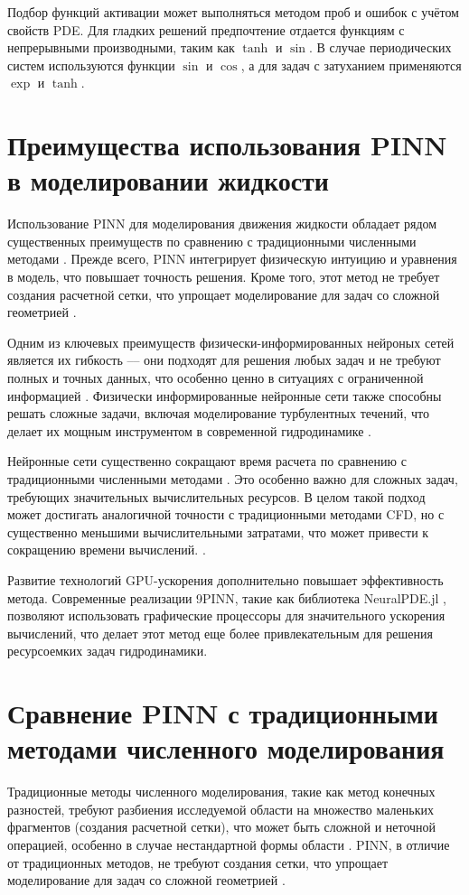 Подбор функций активации может выполняться методом проб и ошибок с учётом свойств PDE. Для гладких решений
предпочтение отдается функциям с непрерывными производными, таким как $\tanh$ и $\sin$. В случае периодических
систем используются функции $\sin$ и $\cos$, а для задач с затуханием применяются $\exp$ и $\tanh$.


\section{Преимущества использования PINN в моделировании жидкости}
Использование PINN для моделирования движения жидкости обладает рядом существенных преимуществ по сравнению
с традиционными численными методами \cite{cuomo2022scientific}. Прежде всего, PINN интегрирует физическую
интуицию и уравнения в модель, что повышает точность решения. Кроме того, этот метод не требует создания
расчетной сетки, что упрощает моделирование для задач со сложной геометрией \cite{cai2021physics}.

Одним из ключевых преимуществ физически-информированных нейроных сетей является их гибкость –-- они подходят для решения любых задач и
не требуют полных и точных данных, что особенно ценно в ситуациях с ограниченной
информацией \cite{karniadakis2021physics}. Физически информированные нейронные сети также способны решать
сложные задачи, включая моделирование турбулентных течений, что делает их мощным инструментом в современной
гидродинамике \cite{mao2020physics}.

Нейронные сети существенно сокращают время расчета по сравнению с традиционными численными
методами \cite{jagtap2020conservative}. Это особенно важно для сложных задач, требующих значительных вычислительных
ресурсов. В целом такой подход может достигать аналогичной точности с традиционными методами CFD, но с существенно меньшими
вычислительными затратами, что может привести к сокращению времени вычислений. \cite{Tommaso2024pinn}.

Развитие технологий GPU-ускорения дополнительно повышает эффективность метода. Современные реализации 9PINN, такие
как библиотека NeuralPDE.jl \cite{neuralpde2023}, позволяют использовать графические процессоры для значительного
ускорения вычислений, что делает этот метод еще более привлекательным для решения ресурсоемких задач гидродинамики.

\section{Сравнение PINN с традиционными методами численного моделирования}
Традиционные методы численного моделирования, такие как метод конечных разностей, требуют разбиения исследуемой области
на множество маленьких фрагментов (создания расчетной сетки), что может быть сложной и неточной операцией, особенно в
случае нестандартной формы области \cite{ferziger2019computational}. PINN, в отличие от традиционных методов, не требуют
создания сетки, что упрощает моделирование для задач со сложной геометрией \cite{karniadakis2021physics}.


